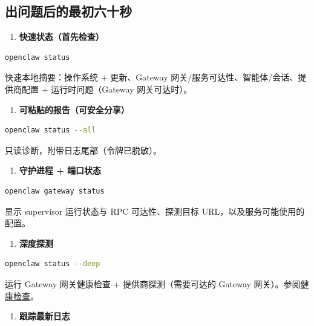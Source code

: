 \subsection{出问题后的最初六十秒}


\begin{enumerate}
  \item \textbf{快速状态（首先检查）}
\end{enumerate}


\begin{lstlisting}[language=bash]
   openclaw status
\end{lstlisting}


快速本地摘要：操作系统 + 更新、Gateway 网关/服务可达性、智能体/会话、提供商配置 + 运行时问题（Gateway 网关可达时）。

\begin{enumerate}
  \item \textbf{可粘贴的报告（可安全分享）}
\end{enumerate}


\begin{lstlisting}[language=bash]
   openclaw status --all
\end{lstlisting}


只读诊断，附带日志尾部（令牌已脱敏）。

\begin{enumerate}
  \item \textbf{守护进程 + 端口状态}
\end{enumerate}


\begin{lstlisting}[language=bash]
   openclaw gateway status
\end{lstlisting}


显示 supervisor 运行状态与 RPC 可达性、探测目标 URL，以及服务可能使用的配置。

\begin{enumerate}
  \item \textbf{深度探测}
\end{enumerate}


\begin{lstlisting}[language=bash]
   openclaw status --deep
\end{lstlisting}


运行 Gateway 网关健康检查 + 提供商探测（需要可达的 Gateway 网关）。参阅\href{/gateway/health}{健康检查}。

\begin{enumerate}
  \item \textbf{跟踪最新日志}
\end{enumerate}



